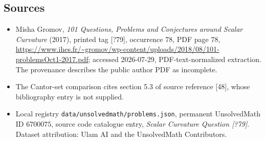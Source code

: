 \documentclass[11pt]{article}
\begin{document}
\subsection{Sources}
\begin{itemize}
\item Misha Gromov, \emph{101 Questions, Problems and Conjectures around Scalar Curvature} (2017), printed tag [?79], occurrence 78, PDF page 78, \url{https://www.ihes.fr/~gromov/wp-content/uploads/2018/08/101-problemsOct1-2017.pdf}; accessed 2026-07-29, PDF-text-normalized extraction. The provenance describes the public author PDF as incomplete.
\item The Cantor-set comparison cites section 5.3 of source reference [48], whose bibliography entry is not supplied.
\item Local registry \texttt{data/unsolvedmath/problems.json}, permanent UnsolvedMath ID $6700075$, source code catalogue entry, \emph{Scalar Curvature Question [?79]}. Dataset attribution: Ulam AI and the UnsolvedMath Contributors.
\end{itemize}
\end{document}
